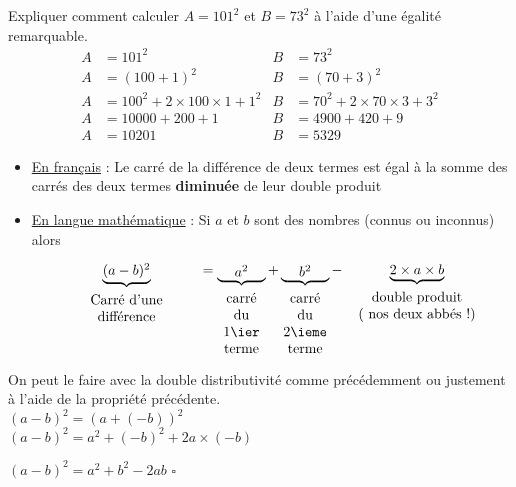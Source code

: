 \begin{exemples*1}
    Expliquer comment calculer $A=101^2$ et $B=73^2$ à l'aide d'une égalité remarquable.
    \correction
    \begin{align*}
        A&=101^2                            &B&=73^2\\
        A&=(100+1)^2                        &B&=(70+3)^2\\
        A&=100^2+2\times 100\times 1 + 1^2  &B&=70^2 + 2\times 70\times 3 + 3^2\\
        A&=\num{10000}+200 + 1              &B&=\num{4900} + 420 + 9\\
        A&=\num{10201}                      &B&=\num{5329}
    \end{align*}
\end{exemples*1}

\begin{propriete}
    \begin{itemize}
    \item \underline{En français} : 
    \og{}Le carré de la différence de deux termes est égal à la somme des carrés des deux termes {\bfseries diminuée} de leur double produit\fg{}

    \bigskip
    \item \underline{En \og{}langue\fg{} mathématique} :
    Si $a$ et $b$ sont des nombres (connus ou inconnus) alors 
    
    $$\underbrace{\parbox{0.1\linewidth}{\centering $(a-b)^2$}}_{\parbox{0.3\linewidth}{\centering\vspace*{1mm}Carré d'une\\différence}}
    =\underbrace{\parbox{0.1\linewidth}{\centering $a^2$}}_{\parbox{0.1\linewidth}{\centering\vspace*{1mm}carré du\\1\ier terme}}
    +\underbrace{\parbox{0.1\linewidth}{\centering $b^2$}}_{\parbox{0.1\linewidth}{\centering\vspace*{1mm}carré du\\2\ieme terme}}
    -\underbrace{\centering 2\times a\times b}_{\parbox{0.3\linewidth}{\centering\vspace*{1mm}double produit\\( nos deux abbés !)}}$$    
    \end{itemize}
\end{propriete}

\begin{preuve}
    On peut le faire avec la double distributivité comme précédemment ou justement à l’aide de la propriété précédente.\\
    $(a-b)^2=(a+(-b))^2$\\
    $(a-b)^2=a^2+(-b)^2+2a\times(-b)$\par
    $(a-b)^2=a^2+b^2-2ab$ $\square$
\end{preuve}

